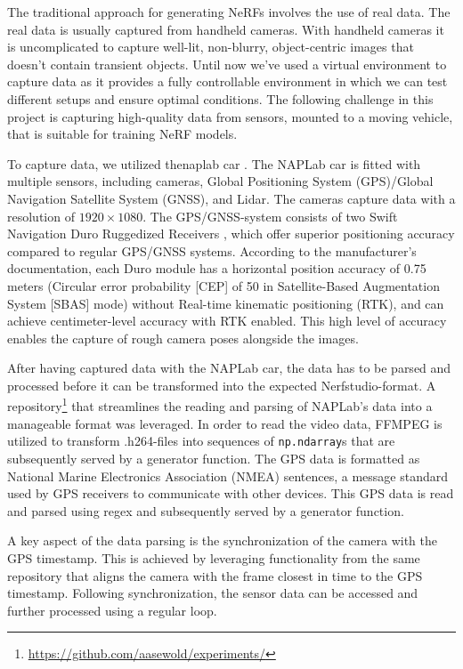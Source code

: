 The traditional approach for generating NeRFs involves the use of real data. The real data is usually captured from handheld cameras. With handheld cameras it is uncomplicated to capture well-lit, non-blurry, object-centric images that doesn't contain transient objects. Until now we've used a virtual environment to capture data as it provides a fully controllable environment in which we can test different setups and ensure optimal conditions. The following challenge in this project is capturing high-quality data from sensors, mounted to a moving vehicle, that is suitable for training NeRF models.

To capture data, we utilized the\acrshort{naplab} car \cite{naplab}. The NAPLab car is fitted with multiple sensors, including cameras, Global Positioning System (GPS)/Global Navigation Satellite System (GNSS), and Lidar. The cameras capture data with a resolution of $1920 \times 1080$. The GPS/GNSS-system consists of two Swift Navigation Duro Ruggedized Receivers \cite{swift_navigation_duro_manual}, which offer superior positioning accuracy compared to regular GPS/GNSS systems. According to the manufacturer’s documentation, each Duro module has a horizontal position accuracy of 0.75 meters (Circular error probability [CEP] of 50 in Satellite-Based Augmentation System [SBAS] mode) without Real-time kinematic positioning (RTK), and can achieve centimeter-level accuracy with RTK enabled. This high level of accuracy enables the capture of rough camera poses alongside the images.

After having captured data with the NAPLab car, the data has to be parsed and processed before it can be transformed into the expected Nerfstudio-format. A repository\footnote{\url{https://github.com/aasewold/experiments/}} that streamlines the reading and parsing of NAPLab's data into a manageable format was leveraged. In order to read the video data, FFMPEG is utilized to transform .h264-files into sequences of \texttt{np.ndarray}s that are subsequently served by a generator function. The GPS data is formatted as National Marine Electronics Association (NMEA) sentences, a message standard used by GPS receivers to communicate with other devices. This GPS data is read and parsed using regex and subsequently served by a generator function. 

A key aspect of the data parsing is the synchronization of the camera with the GPS timestamp. This is achieved by leveraging functionality from the same repository that aligns the camera with the frame closest in time to the GPS timestamp. Following synchronization, the sensor data can be accessed and further processed using a regular loop.

